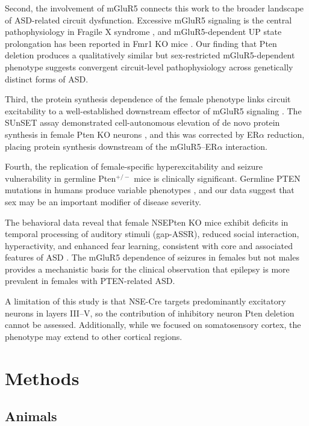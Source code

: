 \documentclass[11pt]{article}
\begin{document}
Second, the involvement of mGluR5 connects this work to the broader landscape of ASD-related circuit dysfunction. Excessive mGluR5 signaling is the central pathophysiology in Fragile X syndrome \citep{huber2002altered, dolen2007correction}, and mGluR5-dependent UP state prolongation has been reported in Fmr1 KO mice \citep{hays2011altered, gibson2008imbalance}. Our finding that Pten deletion produces a qualitatively similar but sex-restricted mGluR5-dependent phenotype suggests convergent circuit-level pathophysiology across genetically distinct forms of ASD.

Third, the protein synthesis dependence of the female phenotype links circuit excitability to a well-established downstream effector of mGluR5 signaling \citep{huber2002altered, ronesi2012homer}. The SUnSET assay demonstrated cell-autonomous elevation of de novo protein synthesis in female Pten KO neurons \citep{schmidt2009sUnSET}, and this was corrected by ER$\alpha$ reduction, placing protein synthesis downstream of the mGluR5--ER$\alpha$ interaction.

Fourth, the replication of female-specific hyperexcitability and seizure vulnerability in germline Pten$^{+/-}$ mice is clinically significant. Germline PTEN mutations in humans produce variable phenotypes \citep{butler2005subset}, and our data suggest that sex may be an important modifier of disease severity.

The behavioral data reveal that female NSEPten KO mice exhibit deficits in temporal processing of auditory stimuli (gap-ASSR), reduced social interaction, hyperactivity, and enhanced fear learning, consistent with core and associated features of ASD \citep{lovelace2018mirroring}. The mGluR5 dependence of seizures in females but not males provides a mechanistic basis for the clinical observation that epilepsy is more prevalent in females with PTEN-related ASD.

A limitation of this study is that NSE-Cre targets predominantly excitatory neurons in layers III--V, so the contribution of inhibitory neuron Pten deletion cannot be assessed. Additionally, while we focused on somatosensory cortex, the phenotype may extend to other cortical regions.

\section{Methods}

\subsection{Animals}
\end{document}
